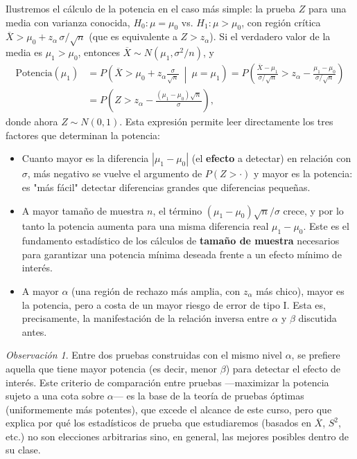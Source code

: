 \documentclass[11pt,a4paper]{article}
\theoremstyle{plain}
\theoremstyle{definition}
\theoremstyle{remark}
\newtheorem{observacion}[teorema]{Observación}
\begin{document}
Ilustremos el cálculo de la potencia en el caso más simple: la prueba $Z$ para una media con varianza conocida, $H_0:\mu=\mu_0$ vs. $H_1:\mu>\mu_0$, con región crítica $\overline{X}>\mu_0+z_\alpha\,\sigma/\sqrt n$ (que es equivalente a $Z>z_\alpha$). Si el verdadero valor de la media es $\mu_1>\mu_0$, entonces $\overline{X}\sim N(\mu_1,\sigma^2/n)$, y
\begin{align*}
\text{Potencia}(\mu_1) &= P\!\left(\overline{X}>\mu_0+z_\alpha\frac{\sigma}{\sqrt n}\ \middle|\ \mu=\mu_1\right)
= P\!\left(\frac{\overline{X}-\mu_1}{\sigma/\sqrt n} > z_\alpha-\frac{\mu_1-\mu_0}{\sigma/\sqrt n}\right)\\
&= P\!\left(Z > z_\alpha - \frac{(\mu_1-\mu_0)\sqrt n}{\sigma}\right),
\end{align*}
donde ahora $Z\sim N(0,1)$. Esta expresión permite leer directamente los tres factores que determinan la potencia:

\begin{itemize}[nosep]
\item Cuanto mayor es la diferencia $|\mu_1-\mu_0|$ (el \textbf{efecto} a detectar) en relación con $\sigma$, más negativo se vuelve el argumento de $P(Z>\cdot)$ y mayor es la potencia: es "más fácil" detectar diferencias grandes que diferencias pequeñas.
\item A mayor tamaño de muestra $n$, el término $(\mu_1-\mu_0)\sqrt n/\sigma$ crece, y por lo tanto la potencia aumenta para una misma diferencia real $\mu_1-\mu_0$. Este es el fundamento estadístico de los cálculos de \textbf{tamaño de muestra} necesarios para garantizar una potencia mínima deseada frente a un efecto mínimo de interés.
\item A mayor $\alpha$ (una región de rechazo más amplia, con $z_\alpha$ más chico), mayor es la potencia, pero a costa de un mayor riesgo de error de tipo I. Esta es, precisamente, la manifestación de la relación inversa entre $\alpha$ y $\beta$ discutida antes.
\end{itemize}

\begin{observacion}
Entre dos pruebas construidas con el mismo nivel $\alpha$, se prefiere aquella que tiene mayor potencia (es decir, menor $\beta$) para detectar el efecto de interés. Este criterio de comparación entre pruebas —maximizar la potencia sujeto a una cota sobre $\alpha$— es la base de la teoría de pruebas óptimas (uniformemente más potentes), que excede el alcance de este curso, pero que explica por qué los estadísticos de prueba que estudiaremos (basados en $\overline X$, $S^2$, etc.) no son elecciones arbitrarias sino, en general, las mejores posibles dentro de su clase.
\end{observacion}
\end{document}
